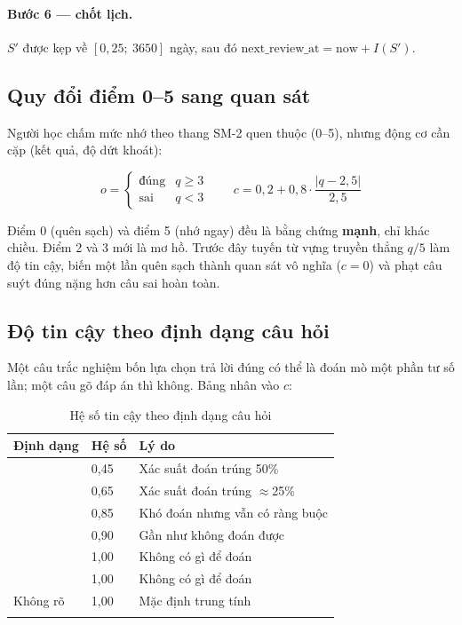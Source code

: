 \paragraph{Bước 6 — chốt lịch.} \(S'\) được kẹp về \([0{,}25;\ 3650]\) ngày, sau đó
\(\text{next\_review\_at} = \text{now} + I(S')\).

\subsection{Quy đổi điểm 0--5 sang quan sát}

Người học chấm mức nhớ theo thang SM-2 quen thuộc (0--5), nhưng động cơ cần cặp
(kết quả, độ dứt khoát):

\begin{equation}
o = \begin{cases}\text{đúng} & q \ge 3\\ \text{sai} & q < 3\end{cases}
\qquad
c = 0{,}2 + 0{,}8 \cdot \frac{|q - 2{,}5|}{2{,}5}
\end{equation}

\begin{luuy}
Điểm 0 (quên sạch) và điểm 5 (nhớ ngay) đều là bằng chứng \textbf{mạnh}, chỉ khác chiều.
Điểm 2 và 3 mới là mơ hồ. Trước đây tuyến từ vựng truyền thẳng \(q/5\) làm độ tin cậy,
biến một lần quên sạch thành quan sát vô nghĩa (\(c = 0\)) và phạt câu suýt đúng nặng hơn
câu sai hoàn toàn.
\end{luuy}

\subsection{Độ tin cậy theo định dạng câu hỏi}
\label{sec:format-confidence}

Một câu trắc nghiệm bốn lựa chọn trả lời đúng có thể là đoán mò một phần tư số lần; một
câu gõ đáp án thì không. Bảng  nhân vào \(c\):

\begin{longtable}{L{4.4cm} L{2.6cm} L{6.6cm}}
\toprule
\textbf{Định dạng} & \textbf{Hệ số} & \textbf{Lý do}\\
\midrule
\endhead
{} & 0,45 & Xác suất đoán trúng 50\%\\
 & 0,65 & Xác suất đoán trúng \(\approx\)25\%\\
 & 0,85 & Khó đoán nhưng vẫn có ràng buộc\\
 & 0,90 & Gần như không đoán được\\
 & 1,00 & Không có gì để đoán\\
 & 1,00 & Không có gì để đoán\\
Không rõ & 1,00 & Mặc định trung tính\\
\bottomrule
\caption{Hệ số tin cậy theo định dạng câu hỏi}
\end{longtable}

